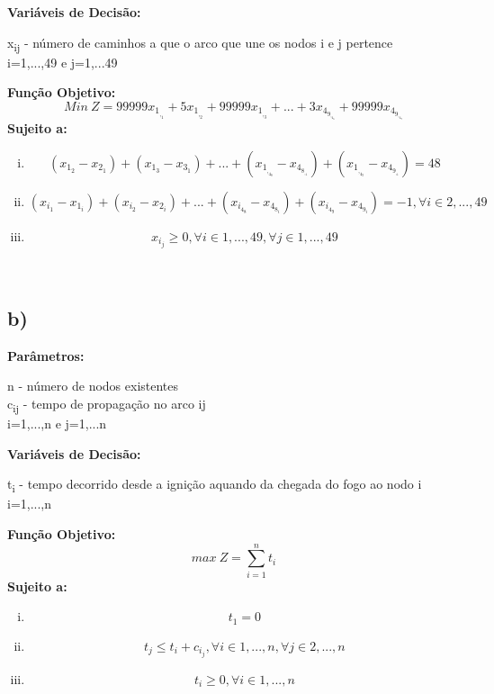 \documentclass[11pt]{article} %
\begin{document}
\newpage

\textbf{Variáveis de Decisão:} \\
\begin{center}
x\textsubscript{ij} - número de caminhos a que o arco que une os nodos i e j pertence\\
i=1,...,49 e j=1,...49 \\
\end{center}
\textbf{Função Objetivo:}
$$Min \ Z = 99999x_1_,_1 + 5x_1_,_2+99999x_1_,_3+...+3x_4_9_,_4_8+99999x_4_9_,_4_9$$
\textbf{Sujeito a:}
\begin{enumerate}[(i)]
\item $$(x_1_2-x_2_1)+(x_1_3-x_3_1)+...+(x_1_,_4_8-x_4_8_,_1)+(x_1_,_4_9-x_4_9_,_1)=48$$
\item $$(x_i_1-x_1_i)+(x_i_2-x_2_i)+...+(x_i_4_8-x_4_8_i)+(x_i_4_9-x_4_9_i)=-1, \forall i \in 2,...,49 $$
\item $$x_i_j \geq 0, \forall i \in 1,...,49, \forall j \in 1,...,49$$
\end{enumerate}\\

\subsection*{b)}

\textbf{Parâmetros:}
\begin{center}
n - número de nodos existentes \\
c\textsubscript{ij} - tempo de propagação no arco ij\\
i=1,...,n e j=1,...n \\
\end{center}
\textbf{Variáveis de Decisão:} \\
\begin{center}
t\textsubscript{i} - tempo decorrido desde a ignição aquando da chegada do fogo ao nodo i\\
i=1,...,n\\
\end{center}
\textbf{Função Objetivo:}
$$max \ Z = \sum_{i=1}^{n} t_i$$
\textbf{Sujeito a:}
\begin{enumerate}[(i)]
\item $$t_1 = 0$$
\item $$t_j \leq t_i + c_i_j, \forall i \in 1,...,n , \forall j \in 2,...,n$$
\item $$t_i \geq 0, \forall i \in 1,...,n$$
\end{enumerate}
\end{document}
